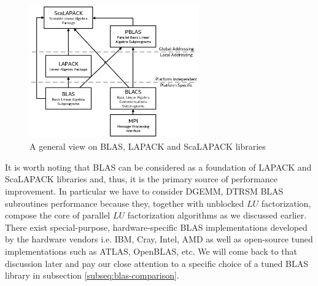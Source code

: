 \begin{figure}[htpb]
  \centering
  \includegraphics[width=0.65\textwidth]{figures/chapter-2/lapack-scalapack-blas.png}
\caption{A general view on BLAS, LAPACK and ScaLAPACK libraries \cite{netlib:lapack-scalapack-general-view}}
\label{fig:blas-lapack-scalapack}
\end{figure}

It is worth noting that BLAS can be considered as a foundation of LAPACK and ScaLAPACK libraries and, thus, it is the primary source of performance improvement. In particular we have to consider DGEMM, DTRSM BLAS subroutines performance because they, together with unblocked $LU$ factorization, compose the core of parallel $LU$ factorization algorithms as we discussed earlier.\\

There exist special-purpose, hardware-specific BLAS implementations developed by the hardware vendors i.e. IBM, Cray, Intel, AMD as well as open-source tuned implementations such as ATLAS, OpenBLAS, etc. We will come back to that discussion later and pay our close attention to a specific choice of a tuned BLAS library in subsection \ref{subseq:blas-comparison}.
